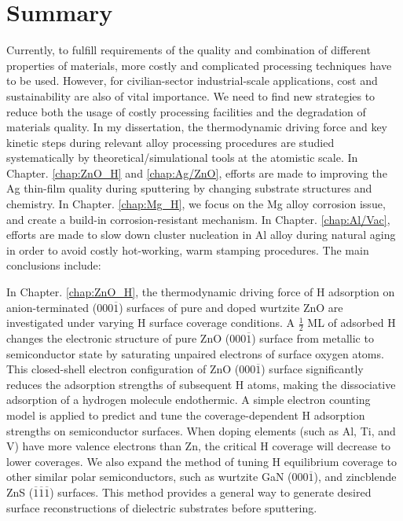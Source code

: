 \section{Summary}

Currently, to fulfill requirements of the quality and combination of different properties of materials, more costly and complicated processing techniques have to be used. However, for civilian-sector industrial-scale applications, cost and sustainability are also of vital importance. We need to find new strategies to reduce both the usage of costly processing facilities and the degradation of materials quality. In my dissertation, the thermodynamic driving force and key kinetic steps during relevant alloy processing procedures are studied systematically by theoretical/simulational tools at the atomistic scale. In Chapter. \ref{chap:ZnO_H} and \ref{chap:Ag/ZnO}, efforts are made to improving the Ag thin-film quality during sputtering by changing substrate structures and chemistry. In Chapter. \ref{chap:Mg_H}, we focus on the Mg alloy corrosion issue, and create a build-in corrosion-resistant mechanism. In Chapter. \ref{chap:Al/Vac}, efforts are made to slow down cluster nucleation in Al alloy during natural aging in order to avoid costly hot-working, warm stamping procedures. The main conclusions include:

In Chapter. \ref{chap:ZnO_H}, the thermodynamic driving force of H adsorption on anion-terminated (000$\overline{1}$) surfaces of pure and doped wurtzite ZnO are investigated under varying H surface coverage conditions. A $\frac{1}{2}$ \ac{ML} of adsorbed H changes the electronic structure of pure ZnO (000$\overline{1}$) surface from metallic to semiconductor state by saturating unpaired electrons of surface oxygen atoms. This closed-shell electron configuration of ZnO (000$\overline{1}$) surface significantly reduces the adsorption strengths of subsequent H atoms, making the dissociative adsorption of a hydrogen molecule endothermic. A simple electron counting model is applied to predict and tune the coverage-dependent H adsorption strengths on semiconductor surfaces. When doping elements (such as Al, Ti, and V) have more valence electrons than Zn, the critical H coverage will decrease to lower coverages. We also expand the method of tuning H equilibrium coverage to other similar polar semiconductors, such as wurtzite GaN (000$\overline{1}$), and zincblende ZnS ($\overline{1}$$\overline{1}$$\overline{1}$) surfaces. This method provides a general way to generate desired surface reconstructions of dielectric substrates before sputtering.

